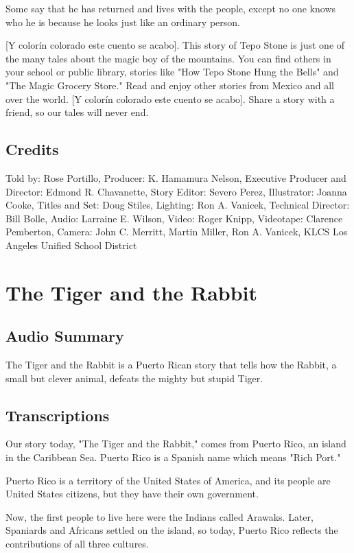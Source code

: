 Some say that he has returned and lives with the people, except no one knows who he is because he looks just like an ordinary person.

    [Y colorín colorado este cuento se acabo]. This story of Tepo Stone is just one of the many tales about the magic boy of the mountains. You can find others in your school or public library, stories like "How Tepo Stone Hung the Bells" and "The Magic Grocery Store." Read and enjoy other stories from Mexico and all over the world.  [Y colorín colorado este cuento se acabo]. Share a story with a friend, so our tales will never end.

\subsection{Credits}

Told by: Rose Portillo,
Producer: K. Hamamura Nelson,
Executive Producer and Director: Edmond R. Chavanette,
Story Editor: Severo Perez,
Illustrator: Joanna Cooke,
Titles and Set: Doug Stiles,
Lighting: Ron A. Vanicek,
Technical Director: Bill Bolle,
Audio: Larraine E. Wilson,
Video: Roger Knipp,
Videotape: Clarence Pemberton,
Camera: John C. Merritt, Martin Miller, Ron A. Vanicek,
KLCS Los Angeles Unified School District

\section{The Tiger and the Rabbit}

\subsection{Audio Summary}

The Tiger and the Rabbit is a Puerto Rican story that tells how the Rabbit, a small but clever animal, defeats the mighty but stupid Tiger.

\subsection{Transcriptions}

Our story today, "The Tiger and the Rabbit," comes from Puerto Rico, an island in the Caribbean Sea. Puerto Rico is a Spanish name which means "Rich Port."

Puerto Rico is a territory of the United States of America, and its people are United States citizens, but they have their own government.

Now, the first people to live here were the Indians called Arawaks. Later, Spaniards and Africans settled on the island, so today, Puerto Rico reflects the contributions of all three cultures.

